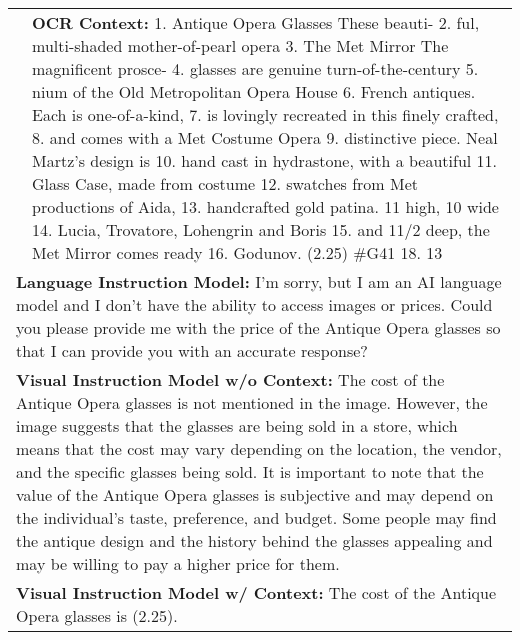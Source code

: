 \documentclass[10pt,twocolumn,letterpaper]{article}
\begin{document}
\begin{figure*}[t]
{\begin{tabular}{ll}
& \begin{minipage}[t]{0.62\columnwidth}\textbf{OCR  Context:} 1. Antique Opera Glasses These beauti-  2. ful, multi-shaded mother-of-pearl opera 3. The Met Mirror The magnificent prosce- 4. glasses are genuine turn-of-the-century 5. nium of the Old Metropolitan Opera House 6. French antiques. Each is one-of-a-kind, 7. is lovingly recreated in this finely crafted, 8. and comes with a Met Costume Opera 9. distinctive piece. Neal Martz's design is 10. hand cast in hydrastone, with a beautiful 11. Glass Case, made from costume 12. swatches from Met productions of Aida, 13. handcrafted gold patina. 11 high, 10 wide 14. Lucia, Trovatore, Lohengrin and Boris 15. and 11/2 deep, the Met Mirror comes ready 16. Godunov. \45(2.25) \#G41 18. 13\end{minipage} \\

\multicolumn{2}{l}{
 \begin{minipage}[t]{\columnwidth}
\textbf{Language Instruction Model:} I'm sorry, but I am an AI language model and I don't have the ability to access images or prices. Could you please provide me with the price of the Antique Opera glasses so that I can provide you with an accurate response? \end{minipage}
}
\\

\multicolumn{2}{l}{
\begin{minipage}[t]{\columnwidth}
\textbf{Visual Instruction Model w/o Context:} The cost of the Antique Opera glasses is not mentioned in the image. However, the image suggests that the glasses are being sold in a store, which means that the cost may vary depending on the location, the vendor, and the specific glasses being sold.  It is important to note that the value of the Antique Opera glasses is subjective and may depend on the individual's taste, preference, and budget. Some people may find the antique design and the history behind the glasses appealing and may be willing to pay a higher price for them.\end{minipage}
}
\\

\multicolumn{2}{l}{
\begin{minipage}[t]{\columnwidth}
\textbf{Visual Instruction Model w/ Context:} The cost of the Antique Opera glasses is \45 (2.25).\end{minipage}
}


\end{tabular}}
\caption{\textbf{Visual Understanding with the help of OCR Experts.} The example and OCR context are from DocVQA~\cite{mathew2021docvqa}.\vspace{0.2cm}}
\label{tab:integration_w_ocr}
\end{figure*} 
\end{document}
